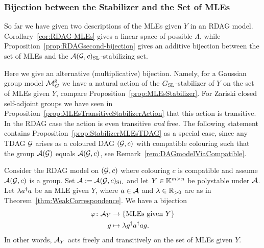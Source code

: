 \subsubsection{Bijection between the Stabilizer and the Set of MLEs}

So far we have given two descriptions of the MLEs given $Y$ in an RDAG model. Corollary~\ref{cor:RDAG-MLEs} gives a linear space of possible $\Lambda$, while Proposition~\ref{prop:RDAGsecond-bijection} gives an additive bijection between the set of MLEs and the $\mathcal{A}(\mathcal{G}, c)_{\operatorname{SL}}$-stabilizing set.

Here we give an alternative (multiplicative) bijection. Namely, for a Gaussian group model $\mathcal{M}^{\mathtt{g}}_G$ we have a natural action of the $G_{\operatorname{SL}}$-stabilizer of $Y$ on the set of MLEs given $Y$, compare Proposition~\ref{prop:MLEsStabilizer}. For Zariski closed self-adjoint groups we have seen in Proposition~\ref{prop:MLEsTransitiveStabilizerAction} that this action is transitive. In the RDAG case the action is even transitive \emph{and} free. The following statement contains Proposition~\ref{prop:StabilizerMLEsTDAG} as a special case, since any TDAG $\mathcal{G}$ arises as a coloured DAG $(\mathcal{G}, c)$ with compatible colouring such that the group $\mathcal{A}(\mathcal{G})$ equals $\mathcal{A}(\mathcal{G}, c)$, see Remark~\ref{rem:DAGmodelViaCompatible}.

\begin{prop} \label{prop:StabilizerMLEsGroupRDAG}
	Consider the RDAG model on $(\mathcal{G}, c)$ where colouring $c$ is compatible and assume $\mathcal{A}(\mathcal{G}, c)$ is a group. Set $\mathcal{A} := \mathcal{A}(\mathcal{G}, c)_{\operatorname{SL}}$ and let $Y \in \mathbb K^{m \times n}$ be polystable under $\mathcal{A}$. Let $\lambda a^{\dagger} a$ be an MLE given $Y$, where $a \in \mathcal{A}$ and $\lambda \in \mathbb R_{>0}$ are as in Theorem~\ref{thm:WeakCorrespondence}. We have a bijection
	\begin{align*}
		\varphi \colon \mathcal{A}_Y &\to \{ \text{MLEs given } Y \} \\
		g &\mapsto \lambda g^{\dagger}  a^{\dagger}  a g .
	\end{align*}
	In other words, $\mathcal{A}_Y$ acts freely and transitively on the set of MLEs given $Y$.
\end{prop}

